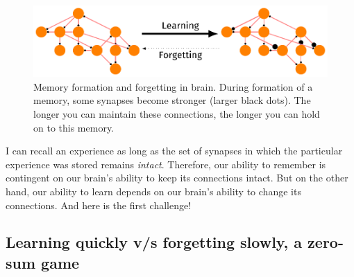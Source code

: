 \documentclass[]{resonance}
\begin{document}
\begin{figure}[!b] 
    \caption{Memory formation and forgetting in brain. During formation of
        a memory, some synapses become stronger (larger black dots). 
        The longer you can maintain these connections, the longer you 
        can hold on to this memory.
    }
    \label{fig:engram}
    \includegraphics[width=\linewidth]{engram.pdf} 
\end{figure}

I can recall an experience as long as the set of synapses in which the
particular experience was stored remains \emph{intact}. Therefore, our ability
to remember is contingent on our brain's ability to keep its connections intact.
But on the other hand, our ability to learn depends on our brain's ability to
change its connections. And here is the first challenge!

\subsection{Learning quickly v/s forgetting slowly, a zero-sum game}\label{subsec:zero_sum} 
\end{document}
